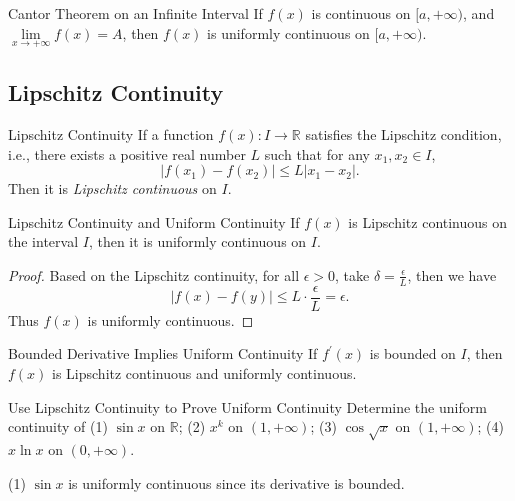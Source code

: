\begin{theorem}{Cantor Theorem on an Infinite Interval}{}
  If $f(x)$ is continuous on $[a, +\infty)$,
  and $\lim \limits _{x \rightarrow +\infty} f(x) = A$,
  then $f(x)$ is uniformly continuous on $[a, +\infty)$.
\end{theorem}

\subsection{Lipschitz Continuity}

\begin{definition}{Lipschitz Continuity}{}
  If a function $f(x): I \rightarrow \mathbb{R}$
  satisfies the Lipschitz condition, i.e.,
  there exists a positive real number $L$ such that
  for any $x_1, x_2 \in I$,
  \begin{equation}
    |f(x_1) - f(x_2)| \leq L |x_1 - x_2|.
  \end{equation}
  Then it is \emph{Lipschitz continuous} on $I$.
\end{definition}

\begin{proposition}{Lipschitz Continuity and Uniform Continuity}{}
  If $f(x)$ is Lipschitz continuous on the interval $I$,
  then it is uniformly continuous on $I$.
\end{proposition}

\begin{proof}
  Based on the Lipschitz continuity, for all $\epsilon > 0$,
  take $\delta = \frac{\epsilon}{L}$, then we have
  \begin{equation}
    |f(x) - f(y)| \leq L \cdot \frac{\epsilon}{L} = \epsilon.
  \end{equation}
  Thus $f(x)$ is uniformly continuous.
\end{proof}

\begin{corollary}{Bounded Derivative Implies Uniform Continuity}{}
  If $f^{\prime}(x)$ is bounded on $I$, then $f(x)$ is Lipschitz continuous and
  uniformly continuous.
\end{corollary}

\begin{example}{Use Lipschitz Continuity to Prove Uniform Continuity}{}
  Determine the uniform continuity of
  (1) $\sin x$ on $\mathbb{R}$;
  (2) $x^k$ on $(1, +\infty)$;
  (3) $\cos \sqrt{x}$ on $(1, +\infty)$;
  (4) $x \ln x$ on $(0, +\infty)$.
\end{example}

\begin{solution}
  (1) $\sin x$ is uniformly continuous since its derivative is bounded.
\end{solution}

